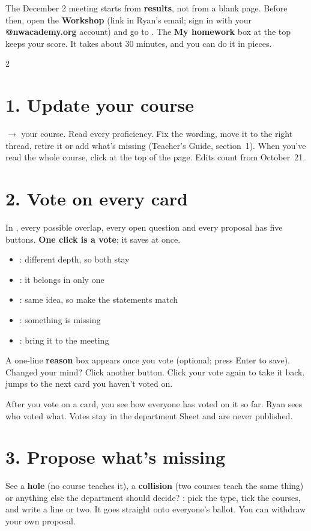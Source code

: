 \documentclass[10pt]{article}
\begin{document}

The December 2 meeting starts from \textbf{results}, not from a blank page. Before then, open the
\textbf{Workshop} (link in Ryan's email; sign in with your \textbf{@nwacademy.org} account) and go to
. The \textbf{My homework} box at the top keeps your score. It takes about 30 minutes,
and you can do it in pieces.

\begin{multicols}{2}
\section*{1. Update your course}
 $\to$ your course. Read every proficiency. Fix the wording, move it to the right thread,
retire it or add what's missing (Teacher's Guide, section~1). When you've read the whole course, click
 at the top of the page. Edits count from October~21.

\section*{2. Vote on every card}
In , every possible overlap, every open question and every proposal has five buttons.
\textbf{One click is a vote}; it saves at once.
\begin{itemize}
\item {}: different depth, so both stay
\item {}: it belongs in only one
\item {}: same idea, so make the statements match
\item {}: something is missing
\item {}: bring it to the meeting
\end{itemize}
A one-line \textbf{reason} box appears once you vote (optional; press Enter to save). Changed your
mind? Click another button. Click your vote again to take it back.  jumps to
the next card you haven't voted on.

After you vote on a card, you see how everyone has voted on it so far. Ryan sees who voted what.
Votes stay in the department Sheet and are never published.

\columnbreak
\section*{3. Propose what's missing}
See a \textbf{hole} (no course teaches it), a \textbf{collision} (two courses teach the same thing) or
anything else the department should decide? : pick the type, tick the courses,
and write a line or two. It goes straight onto everyone's ballot. You can withdraw your own proposal.


\end{multicols}
\end{document}
